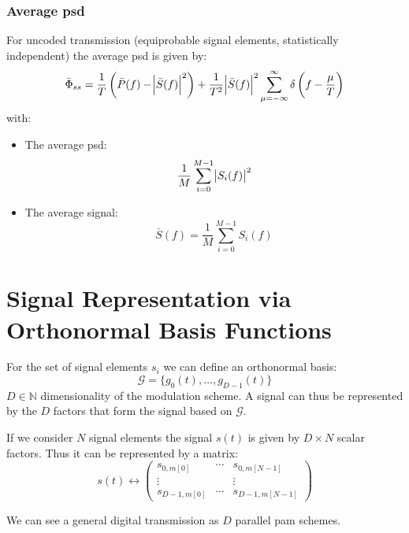 \subsubsection{Average \acl{psd}}
For uncoded transmission (equiprobable signal elements, statistically independent)
the average \ac{psd} is given by:
\begin{equation}
    \bar{\Phi}_{ss} = \frac{1}{T} \left(\bar{P}(f) - \abs{\bar{S}(f)}^2\right)
        + \frac{1}{T^2} \abs{\bar{S}(f)}^2 \sum_{\mu=-\infty}^\infty
        \delta \left(f - \frac{\mu}{T}\right)
\end{equation}
with:
\begin{itemize}
    \item The average \ac{psd}:
        \begin{equation}
            \frac{1}{M} \sum_{i=0}^{M-1} \abs{S_i(f)}^2
        \end{equation}
    \item The average signal:
        \begin{equation}
            \bar{S}(f) = \frac{1}{M} \sum_{i=0}^{M-1} S_i(f)
        \end{equation} 
\end{itemize}

\section{Signal Representation via Orthonormal Basis Functions}
For the set of signal elements $s_i$ we can define an orthonormal basis:
\begin{equation}
    \mathcal{G} = \{g_0(t), \ldots, g_{D-1}(t)\}
\end{equation}
$D \in \mathbb{N}$ dimensionality of the modulation scheme. A signal can thus be 
represented by the $D$ factors that form the signal based on $\mathcal{G}$.

If we consider $N$ signal elements the signal $s(t)$ is given by $D \times N$ scalar
factors. Thus it can be represented by a matrix:
\begin{equation}
    s(t) \leftrightarrow 
    \begin{pmatrix}
        s_{0,m[0]} & \cdots  & s_{0,m[N-1]} \\
        \vdots & & \vdots \\
        s_{D-1,m[0]} & \cdots & s_{D-1, m[N-1]}
    \end{pmatrix}
\end{equation}

We can see a general digital transmission as $D$ parallel \ac{pam} schemes.


